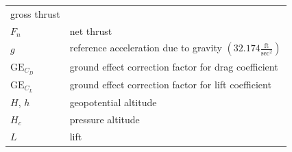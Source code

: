 \documentclass[
]{book}
\begin{document}
\begin{longtable}[]{@{}ll@{}}
\begin{minipage}[t]{0.80\columnwidth}
gross thrust\strut
\end{minipage}\tabularnewline
\begin{minipage}[t]{0.14\columnwidth}\raggedright
\(F_n\)\strut
\end{minipage} & \begin{minipage}[t]{0.80\columnwidth}\raggedright
net thrust\strut
\end{minipage}\tabularnewline
\begin{minipage}[t]{0.14\columnwidth}\raggedright
\(g\)\strut
\end{minipage} & \begin{minipage}[t]{0.80\columnwidth}\raggedright
reference acceleration due to gravity \(\left( 32.174 \frac{\text{ft}}{\text{sec}^2} \right)\)\strut
\end{minipage}\tabularnewline
\begin{minipage}[t]{0.14\columnwidth}\raggedright
\(\mathrm{GE}_{C_D}\)\strut
\end{minipage} & \begin{minipage}[t]{0.80\columnwidth}\raggedright
ground effect correction factor for drag coefficient\strut
\end{minipage}\tabularnewline
\begin{minipage}[t]{0.14\columnwidth}\raggedright
\(\mathrm{GE}_{C_L}\)\strut
\end{minipage} & \begin{minipage}[t]{0.80\columnwidth}\raggedright
ground effect correction factor for lift coefficient\strut
\end{minipage}\tabularnewline
\begin{minipage}[t]{0.14\columnwidth}\raggedright
\(H\), \(h\)\strut
\end{minipage} & \begin{minipage}[t]{0.80\columnwidth}\raggedright
geopotential altitude\strut
\end{minipage}\tabularnewline
\begin{minipage}[t]{0.14\columnwidth}\raggedright
\(H_c\)\strut
\end{minipage} & \begin{minipage}[t]{0.80\columnwidth}\raggedright
pressure altitude\strut
\end{minipage}\tabularnewline
\begin{minipage}[t]{0.14\columnwidth}\raggedright
\(L\)\strut
\end{minipage} & \begin{minipage}[t]{0.80\columnwidth}\raggedright
lift\strut
\end{minipage}\tabularnewline

\end{longtable}
\end{document}
